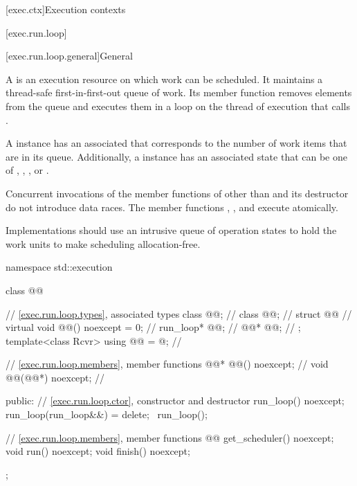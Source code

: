 [exec.ctx]{Execution contexts}

[exec.run.loop]{}

[exec.run.loop.general]{General}

\pnum
A  is an execution resource on which work can be scheduled.
It maintains a thread-safe first-in-first-out queue of work.
Its  member function removes elements from the queue and
executes them in a loop on the thread of execution that calls .

\pnum
A  instance has an associated 
that corresponds to the number of work items that are in its queue.
Additionally, a  instance has an associated state
that can be one of
, , , or .

\pnum
Concurrent invocations of the member functions of 
other than  and its destructor do not introduce data races.
The member functions
, , and 
execute atomically.

\pnum
\recommended
Implementations should use an intrusive queue of operation states
to hold the work units to make scheduling allocation-free.

\begin{codeblock}
namespace std::execution {
  class @@ {
    // \ref{exec.run.loop.types}, associated types
    class @@;                                   // \expos
    class @@;                                      // \expos
    struct @@ {                              // \expos
      virtual void @@() noexcept = 0;                      // \expos
      run_loop* @@;                                           // \expos
      @@* @@;                              // \expos
    };
    template<class Rcvr>
      using @@ = @\unspec@;                     // \expos

    // \ref{exec.run.loop.members}, member functions
    @@* @@() noexcept;                // \expos
    void @@(@@*) noexcept;            // \expos

  public:
    // \ref{exec.run.loop.ctor}, constructor and destructor
    run_loop() noexcept;
    run_loop(run_loop&&) = delete;
    ~run_loop();

    // \ref{exec.run.loop.members}, member functions
    @@ get_scheduler() noexcept;
    void run() noexcept;
    void finish() noexcept;
  };
}
\end{codeblock}

